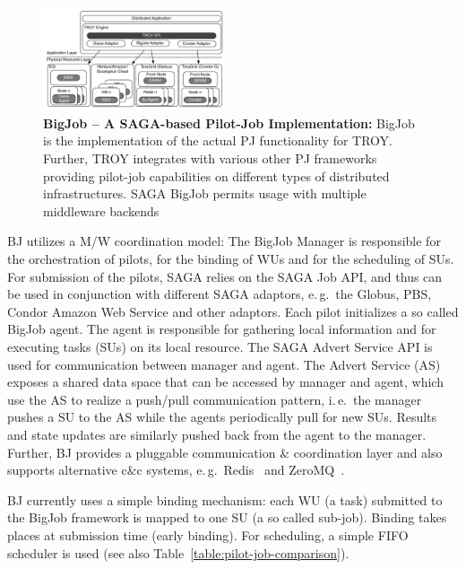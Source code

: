 \documentclass[conference,final]{IEEEtran}
\begin{document}
\begin{figure}[t]
    \centering
    \includegraphics[width=0.48\textwidth]{figures/distributed_pilot_job.pdf}
    \caption{\textbf{BigJob -- A SAGA-based Pilot-Job Implementation:}
      BigJob is the implementation of the actual PJ functionality for
      TROY. Further, TROY integrates with various other PJ frameworks
      providing pilot-job capabilities on different types of
      distributed infrastructures. SAGA BigJob permits usage with
      multiple middleware backends~\cite{saga_bigjob_condor_cloud} }
    \label{fig:figures_distributed_pilot_job}
\end{figure}


BJ utilizes a M/W coordination model: The BigJob Manager is responsible for the
orchestration of pilots, for the binding of WUs and for the scheduling of SUs.
For submission of the pilots, SAGA relies on the SAGA Job API, and thus can be
used in conjunction with different SAGA adaptors, e.\,g.\ the Globus, PBS,
Condor Amazon Web Service and other adaptors. Each pilot initializes a so called
BigJob agent. The agent is responsible for gathering local information and for
executing tasks (SUs) on its local resource. The SAGA Advert Service API is used
for communication between manager and agent. The Advert Service (AS) exposes a
shared data space that can be accessed by manager and agent, which use the AS to
realize a push/pull communication pattern, i.\,e.\ the manager pushes a SU to
the AS while the agents periodically pull for new SUs. Results and state updates
are similarly pushed back from the agent to the manager. Further, BJ provides a
pluggable communication \& coordination layer and also supports alternative c\&c
systems, e.\,g.\ Redis~\cite{redis} and ZeroMQ~\cite{zmq}.

BJ currently uses a simple binding mechanism: each WU (a task)
submitted to the BigJob framework is mapped to one SU (a so called
sub-job).  Binding takes places at submission time (early binding).
For scheduling, a simple FIFO scheduler is used (see also
Table~\ref{table:pilot-job-comparison}).
\end{document}
